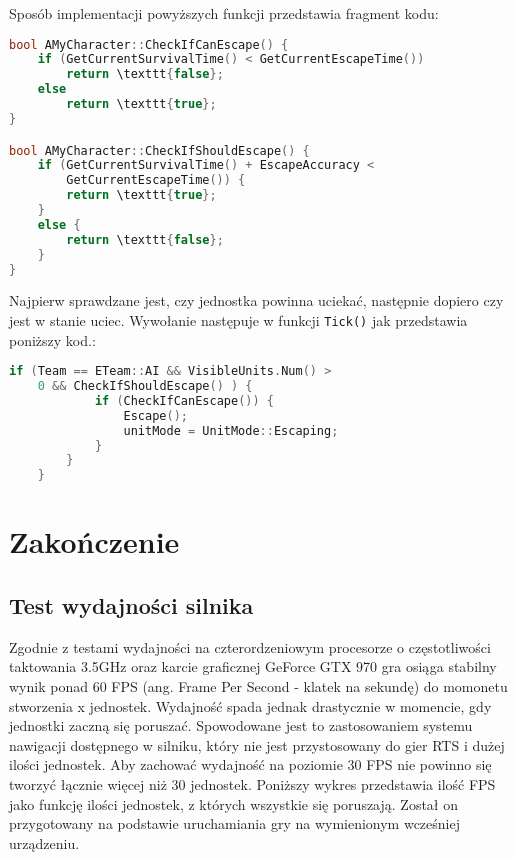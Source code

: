 \documentclass[12pt]{report}
\begin{document}
Sposób implementacji powyższych funkcji przedstawia fragment kodu:

\begin{lstlisting}[language=C++, backgroundcolor=\color{black!5}, basicstyle=\footnotesize, caption=Funkcje CheckIfShouldEscape i CheckIfCanEscape w klasie \texttt{AMyCharacter.cpp}.]
bool AMyCharacter::CheckIfCanEscape() {
	if (GetCurrentSurvivalTime() < GetCurrentEscapeTime())
		return \texttt{false};
	else
		return \texttt{true};
}

bool AMyCharacter::CheckIfShouldEscape() {
	if (GetCurrentSurvivalTime() + EscapeAccuracy < 
	    GetCurrentEscapeTime()) {
		return \texttt{true};
	}
	else {
		return \texttt{false};
	}
}
\end{lstlisting}

Najpierw sprawdzane jest, czy jednostka powinna uciekać, następnie dopiero czy jest w stanie uciec. Wywołanie następuje w funkcji \texttt{\texttt{Tick}()} jak przedstawia poniższy kod.:

\begin{lstlisting}[language=C++, backgroundcolor=\color{black!5}, basicstyle=\footnotesize, caption=Wywołanie funkcji CheckIfShouldEscape i CheckIfCanEscape w funkcji \texttt{\texttt{Tick}()} klasy AMyCharacter.]
if (Team == ETeam::AI && VisibleUnits.Num() > 
    0 && CheckIfShouldEscape() ) {
			if (CheckIfCanEscape()) {
				Escape();
				unitMode = UnitMode::Escaping;
			}
		}
	}
\end{lstlisting}

\chapter{Zakończenie}
\section{Test wydajności silnika}

Zgodnie z testami wydajności na czterordzeniowym procesorze o częstotliwości taktowania 3.5GHz oraz karcie graficznej GeForce GTX 970 gra osiąga stabilny wynik ponad 60 FPS (ang. Frame Per Second - klatek na sekundę) do momonetu stworzenia x jednostek. Wydajność spada jednak drastycznie w momencie, gdy jednostki zaczną się poruszać. Spowodowane jest to zastosowaniem systemu nawigacji dostępnego w silniku, który nie jest przystosowany do gier RTS i dużej ilości jednostek. Aby zachować wydajność na poziomie 30 FPS nie powinno się tworzyć łącznie więcej niż 30 jednostek. Poniższy wykres przedstawia ilość FPS jako funkcję ilości jednostek, z których wszystkie się poruszają. Został on przygotowany na podstawie uruchamiania gry na wymienionym wcześniej urządzeniu. 
\end{document}
